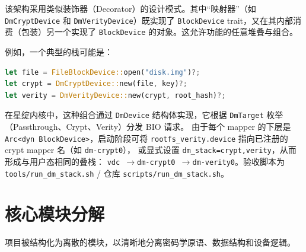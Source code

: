 该架构采用类似装饰器（Decorator）的设计模式。其中“映射器”（如 \texttt{DmCrypt\allowbreak Device} 和 \texttt{DmVerity\allowbreak Device}）既实现了 \texttt{BlockDevice} trait，又在其内部消费（包装）另一个实现了 \texttt{BlockDevice} 的对象。这允许功能的任意堆叠与组合。

例如，一个典型的栈可能是：
\begin{lstlisting}[language=Rust, basicstyle=\ttfamily\small, breaklines=true]
let file = FileBlockDevice::open("disk.img")?;
let crypt = DmCryptDevice::new(file, key)?;
let verity = DmVerityDevice::new(crypt, root_hash)?;
\end{lstlisting}

在星绽内核中，这种组合通过 \texttt{DmDevice} 结构体实现，它根据 \texttt{DmTarget} 枚举（Passthrough、Crypt、Verity）分发 BIO 请求。
由于每个 mapper 的下层是 \texttt{Arc<\allowbreak dyn BlockDevice>}，启动阶段可将
\texttt{rootfs\_\allowbreak verity.device} 指向已注册的 crypt mapper 名（如 \texttt{dm-crypt0}），
或显式设置 \texttt{dm\_\allowbreak stack=\allowbreak crypt,\allowbreak verity}，从而形成与用户态相同的叠栈：
\texttt{vdc \allowbreak$\to$\allowbreak dm-crypt0 \allowbreak$\to$\allowbreak dm-verity0}。验收脚本为
\texttt{tools/\allowbreak run\_\allowbreak dm\_\allowbreak stack.sh} / 仓库 \texttt{scripts/\allowbreak run\_\allowbreak dm\_\allowbreak stack.sh}。

\section{核心模块分解}

项目被结构化为离散的模块，以清晰地分离密码学原语、数据结构和设备逻辑。

